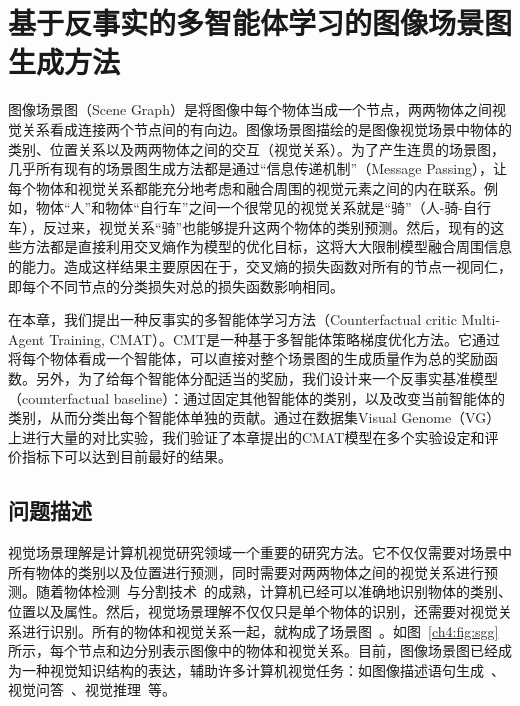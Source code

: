 \chapter{基于反事实的多智能体学习的图像场景图生成方法}

图像场景图（Scene Graph）是将图像中每个物体当成一个节点，两两物体之间视觉关系看成连接两个节点间的有向边。图像场景图描绘的是图像视觉场景中物体的类别、位置关系以及两两物体之间的交互（视觉关系）。为了产生连贯的场景图，几乎所有现有的场景图生成方法都是通过“信息传递机制”（Message Passing），让每个物体和视觉关系都能充分地考虑和融合周围的视觉元素之间的内在联系。例如，物体“人”和物体“自行车”之间一个很常见的视觉关系就是“骑”（人-骑-自行车），反过来，视觉关系“骑”也能够提升这两个物体的类别预测。然后，现有的这些方法都是直接利用交叉熵作为模型的优化目标，这将大大限制模型融合周围信息的能力。造成这样结果主要原因在于，交叉熵的损失函数对所有的节点一视同仁，即每个不同节点的分类损失对总的损失函数影响相同。

在本章，我们提出一种反事实的多智能体学习方法（Counterfactual critic Multi-Agent Training, CMAT）。CMT是一种基于多智能体策略梯度优化方法。它通过将每个物体看成一个智能体，可以直接对整个场景图的生成质量作为总的奖励函数。另外，为了给每个智能体分配适当的奖励，我们设计来一个反事实基准模型（counterfactual baseline）：通过固定其他智能体的类别，以及改变当前智能体的类别，从而分类出每个智能体单独的贡献。通过在数据集Visual Genome（VG）上进行大量的对比实验，我们验证了本章提出的CMAT模型在多个实验设定和评价指标下可以达到目前最好的结果。


\section{问题描述}

视觉场景理解是计算机视觉研究领域一个重要的研究方法。它不仅仅需要对场景中所有物体的类别以及位置进行预测，同时需要对两两物体之间的视觉关系进行预测。随着物体检测~\cite{ren2015faster,liu2016ssd}与分割技术~\cite{long2015fully,he2017mask}的成熟，计算机已经可以准确地识别物体的类别、位置以及属性。然后，视觉场景理解不仅仅只是单个物体的识别，还需要对视觉关系进行识别。所有的物体和视觉关系一起，就构成了场景图~\cite{johnson2015image}。如图~\ref{ch4:fig:sgg}所示，每个节点和边分别表示图像中的物体和视觉关系。目前，图像场景图已经成为一种视觉知识结构的表达，辅助许多计算机视觉任务：如图像描述语句生成~\cite{yao2018exploring,yang2019auto,kim2019dense}、视觉问答~\cite{norcliffe2018learning,hudson2019gqa}、视觉推理~\cite{shi2019explainable,haurilet2019s}等。


